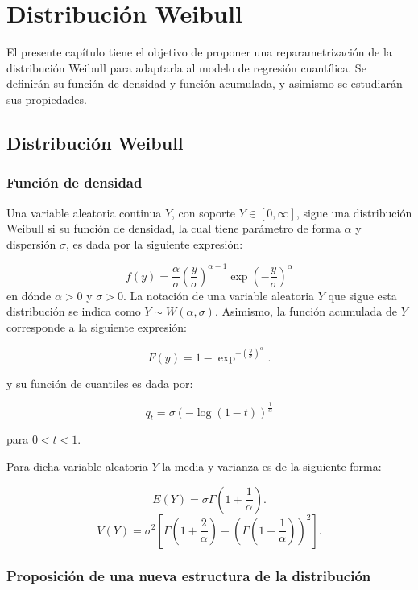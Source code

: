 \chapter{Distribución Weibull}

El presente capítulo tiene el objetivo de proponer una reparametrización de la distribución Weibull para adaptarla al modelo de regresión cuantílica. Se definirán su función de densidad y función acumulada, y asimismo se estudiarán sus propiedades.

\section{Distribución Weibull}

\subsection{Función de densidad}

Una variable aleatoria continua $Y$, con soporte $Y \in [0,\infty]$, sigue una distribución Weibull si su función de densidad, la cual tiene parámetro de forma $\alpha$ y dispersión $\sigma$, es dada por la siguiente expresión:

\begin{equation*}
f{(y)}= \frac{\alpha}{\sigma}\left(\frac{y}{\sigma}\right)^{\alpha-1} \exp{\left(-\frac{y}{\sigma}\right)^{\alpha}}
\end{equation*}
\noindent en dónde $\alpha > 0$ y $\sigma > 0$. La notación de una variable aleatoria $Y$ que sigue esta distribución se indica como $Y \sim W(\alpha,\sigma)$. Asimismo, la función acumulada de $Y$ corresponde a la siguiente expresión:

\[F{(y)}=1-\exp^{-{(\frac{y}{\sigma})}^{\alpha}}.\]

y su función de cuantiles es dada por:

\[q_{t}=\sigma{(-\log{(1-t)})}^{\frac{1}{\alpha}}\]

\noindent para $0 < t < 1$.

Para dicha variable aleatoria $Y$ la media y varianza es de la siguiente forma:

\[E(Y)=\sigma \Gamma\left( 1+\frac{1}{\alpha} \right).\]
\[V(Y)=\sigma^{2}\left[ \Gamma\left( 1+\frac{2}{\alpha} \right)-\left( \Gamma\left( 1+\frac{1}{\alpha} \right) \right)^{2} \right].\]

\subsection{Proposición de una nueva estructura de la distribución}

